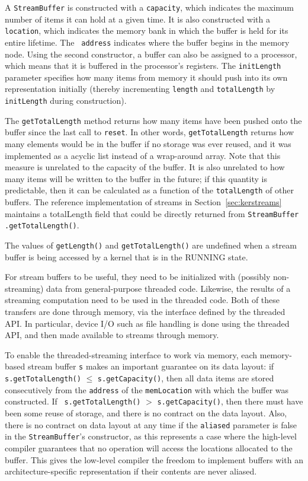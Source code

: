 A {\tt StreamBuffer} is constructed with a {\tt capacity}, which
indicates the maximum number of items it can hold at a given time.  It
is also constructed with a {\tt location}, which indicates the memory
bank in which the buffer is held for its entire lifetime.  The {\tt
address} indicates where the buffer begins in the memory node.  Using
the second constructor, a buffer can also be assigned to a processor,
which means that it is buffered in the processor's registers.  The
{\tt initLength} parameter specifies how many items from memory it
should push into its own representation initially (thereby
incrementing {\tt length} and {\tt totalLength} by {\tt initLength}
during construction).

The {\tt getTotalLength} method returns how many items have been
pushed onto the buffer since the last call to {\tt reset}.  In other
words, {\tt getTotalLength} returns how many elements would be in the
buffer if no storage was ever reused, and it was implemented as a
acyclic list instead of a wrap-around array.  Note that this measure
is unrelated to the capacity of the buffer.  It is also unrelated to
how many items will be written to the buffer in the future; if this
quantity is predictable, then it can be calculated as a function of
the {\tt totalLength} of other buffers.  The reference implementation
of streams in Section~\ref{sec:kerstreams} maintains a totalLength
field that could be directly returned from {\tt StreamBuffer}{\tt
.}{\tt getTotalLength()}.

The values of {\tt getLength()} and {\tt getTotalLength()} are
undefined when a stream buffer is being accessed by a kernel that is
in the RUNNING state.

\label{sec:movestream}

For stream buffers to be useful, they need to be initialized with
(possibly non-streaming) data from general-purpose threaded code.
Likewise, the results of a streaming computation need to be used in
the threaded code.  Both of these transfers are done through memory,
via the interface defined by the threaded API.  In particular, device
I/O such as file handling is done using the threaded API, and then
made available to streams through memory.

To enable the threaded-streaming interface to work via memory, each
memory-based stream buffer {\tt s} makes an important guarantee on its
data layout: if {\tt s.getTotalLength()} $\le$ {\tt s.getCapacity()},
then all data items are stored consecutively from the {\tt address} of
the {\tt memLocation} with which the buffer was constructed.  If {\tt
s.getTotalLength()} $>$ {\tt s.getCapacity()}, then there must have
been some reuse of storage, and there is no contract on the data
layout.  Also, there is no contract on data layout at any time if the
{\tt aliased} parameter is false in the {\tt StreamBuffer}'s
constructor, as this represents a case where the high-level compiler
guarantees that no operation will access the locations allocated to
the buffer.  This gives the low-level compiler the freedom to
implement buffers with an architecture-specific representation if
their contents are never aliased.

